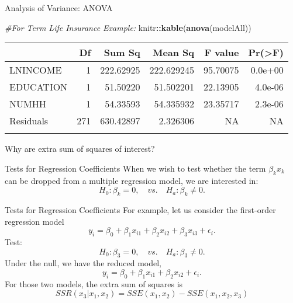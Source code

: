 \documentclass[
  ignorenonframetext,
]{beamer}
\newenvironment{Shaded}{\begin{snugshade}}{\end{snugshade}}
\newcommand{\CommentTok}[1]{\textcolor[rgb]{0.56,0.35,0.01}{\textit{#1}}}
\newcommand{\FunctionTok}[1]{\textcolor[rgb]{0.13,0.29,0.53}{\textbf{#1}}}
\newcommand{\NormalTok}[1]{#1}
\newcommand{\SpecialCharTok}[1]{\textcolor[rgb]{0.81,0.36,0.00}{\textbf{#1}}}
\begin{document}
\begin{frame}[fragile]{Analysis of Variance: ANOVA}
\protect\hypertarget{analysis-of-variance-anova-1}{}
\normalsize

\begin{Shaded}
\begin{Highlighting}[]
\CommentTok{\#For Term Life Insurance Example:}
\NormalTok{knitr}\SpecialCharTok{::}\FunctionTok{kable}\NormalTok{(}\FunctionTok{anova}\NormalTok{(modelAll))}
\end{Highlighting}
\end{Shaded}

\begin{longtable}[]{@{}lrrrrr@{}}
\toprule\noalign{}
& Df & Sum Sq & Mean Sq & F value & Pr(\textgreater F) \\
\midrule\noalign{}
\endhead
LNINCOME & 1 & 222.62925 & 222.629245 & 95.70075 & 0.0e+00 \\
EDUCATION & 1 & 51.50220 & 51.502201 & 22.13905 & 4.0e-06 \\
NUMHH & 1 & 54.33593 & 54.335932 & 23.35717 & 2.3e-06 \\
Residuals & 271 & 630.42897 & 2.326306 & NA & NA \\
\bottomrule\noalign{}
\end{longtable}

\normalsize

Why are extra sum of squares of interest?
\end{frame}

\begin{frame}{Tests for Regression Coefficients}
\protect\hypertarget{tests-for-regression-coefficients}{}
When we wish to test whether the term \(\beta_kx_k\) can be dropped from
a multiple regression model, we are interested in:
\[H_0:\beta_k=0, \quad vs. \quad H_a: \beta_k \neq 0.\]
\end{frame}

\begin{frame}{Tests for Regression Coefficients}
\protect\hypertarget{tests-for-regression-coefficients-1}{}
For example, let us consider the first-order regression model
\[y_i=\beta_0+\beta_1 x_{i1}+\beta_2 x_{i2}+\beta_3 x_{i3}+\epsilon_i.\]
Test: \[H_0:\beta_3=0, \quad vs. \quad H_a: \beta_3\neq 0.\] Under the
null, we have the reduced model,
\[y_i=\beta_0+\beta_1 x_{i1}+\beta_2 x_{i2}+\epsilon_i.\] For those two
models, the extra sum of squares is
\[SSR(x_3|x_1,x_2)=SSE(x_1,x_2)-SSE(x_1,x_2,x_3)\]
\end{frame}
\end{document}
